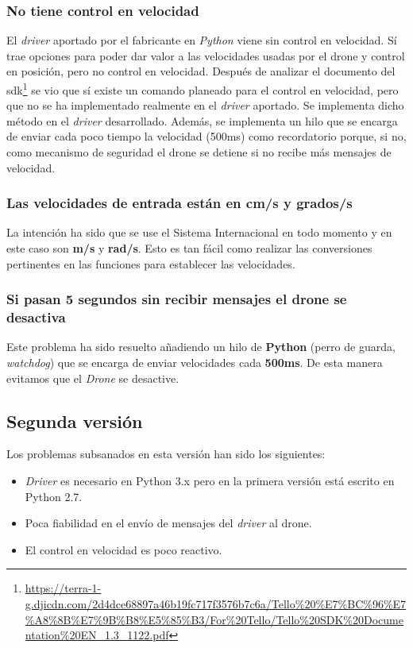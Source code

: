 \subsubsection*{No tiene control en velocidad}
El \textit{driver} aportado por el fabricante en \textit{Python} viene sin control en velocidad. Sí trae opciones para poder dar valor a las velocidades usadas por el drone y control en posición, pero no control en velocidad.
Después de analizar el documento del \acrshort{sdk}\footnote{\url{https://terra-1-g.djicdn.com/2d4dce68897a46b19fc717f3576b7c6a/Tello\%20\%E7\%BC\%96\%E7\%A8\%8B\%E7\%9B\%B8\%E5\%85\%B3/For\%20Tello/Tello\%20SDK\%20Documentation\%20EN_1.3_1122.pdf}} se vio que sí existe un comando planeado para el control en velocidad, pero que no se ha implementado realmente en el \textit{driver} aportado. 
Se implementa dicho método en el \textit{driver} desarrollado. Además, se implementa un hilo que se encarga de enviar cada poco tiempo la velocidad (500ms) como recordatorio porque, si no, como mecanismo de seguridad el drone se detiene si no recibe más mensajes de velocidad.

\subsubsection*{Las velocidades de entrada están en \textbf{cm/s} y \textbf{grados/s}}
La intención ha sido que se use el Sistema Internacional en todo momento y en este caso son \textbf{m/s} y \textbf{rad/s}.
Esto es tan fácil como realizar las conversiones pertinentes en las funciones para establecer las velocidades.

\subsubsection*{Si pasan 5 segundos sin recibir mensajes el drone se desactiva}
Este problema ha sido resuelto añadiendo un hilo de \textbf{Python} (perro de guarda, \textit{watchdog}) que se encarga de enviar velocidades cada \textbf{500ms}. De esta manera evitamos que el \textit{Drone} se desactive.

\subsection{Segunda versión}
Los problemas subsanados en esta versión han sido los siguientes:
\begin{itemize}
  \item \textit{Driver} es necesario en Python 3.x pero en la primera versión está escrito en Python 2.7. 
  \item Poca fiabilidad en el envío de mensajes del \textit{driver} al drone.
  \item El control en velocidad es poco reactivo.
\end{itemize}
